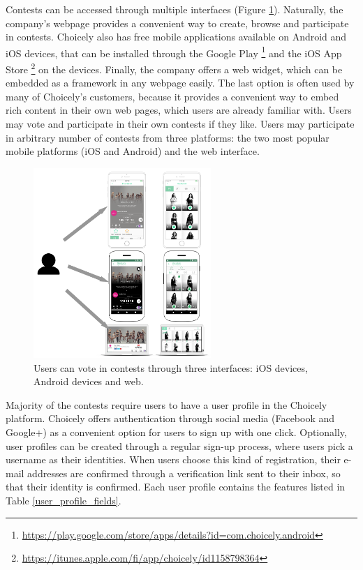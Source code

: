     Contests can be accessed through multiple interfaces (Figure \ref{choicely_platforms}). Naturally, the company's webpage provides a convenient way to create, browse and participate in contests. Choicely also has free mobile applications available on Android and iOS devices, that can be installed through the Google Play \footnote{\url{https://play.google.com/store/apps/details?id=com.choicely.android}} and the iOS App Store \footnote{\url{https://itunes.apple.com/fi/app/choicely/id1158798364}} on the devices. Finally, the company offers a web widget, which can be embedded as a framework in any webpage easily. The last option is often used by many of Choicely's customers, because it provides a convenient way to embed rich content in their own web pages, which users are already familiar with. Users may vote and participate in their own contests if they like. Users may participate in arbitrary number of contests from three platforms: the two most popular mobile platforms (iOS and Android) and the web interface. 
    
    \begin{figure}[h] 
        \begin{center}
            \includegraphics[width=0.6\textwidth]{images/choicely_platforms.png}
            \caption{Users can vote in contests through three interfaces: iOS devices, Android devices and web.}
            \label{choicely_platforms}
        \end{center}
    \end{figure}

    Majority of the contests require users to have a user profile in the Choicely platform. Choicely offers authentication through social media (Facebook and Google+) as a convenient option for users to sign up with one click. Optionally, user profiles can be created through a regular sign-up process, where users pick a username as their identities. When users choose this kind of registration, their e-mail addresses are confirmed through a verification link sent to their inbox, so that their identity is confirmed. 
    Each user profile contains the features listed in Table \ref{user_profile_fields}. %


